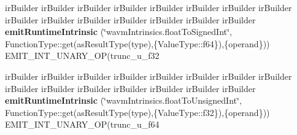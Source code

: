 \begin{DoxyCompactItemize}
ir\+Builder ir\+Builder ir\+Builder ir\+Builder ir\+Builder ir\+Builder ir\+Builder ir\+Builder ir\+Builder ir\+Builder ir\+Builder ir\+Builder ir\+Builder ir\+Builder ir\+Builder {\bfseries emit\+Runtime\+Intrinsic} (\char`\"{}wavm\+Intrinsics.\+float\+To\+Signed\+Int\char`\"{}, Function\+Type\+::get(as\+Result\+Type(type),\{Value\+Type\+::f64\}),\{operand\})) E\+M\+I\+T\+\_\+\+I\+N\+T\+\_\+\+U\+N\+A\+R\+Y\+\_\+\+OP(trunc\+\_\+u\+\_\+f32
\item 
\mbox{\label{struct_l_l_v_m_j_i_t_1_1_emit_function_context_a675ab2f90e2935532bf7257f28fbc1bd}} 
ir\+Builder ir\+Builder ir\+Builder ir\+Builder ir\+Builder ir\+Builder ir\+Builder ir\+Builder ir\+Builder ir\+Builder ir\+Builder ir\+Builder ir\+Builder ir\+Builder ir\+Builder {\bfseries emit\+Runtime\+Intrinsic} (\char`\"{}wavm\+Intrinsics.\+float\+To\+Unsigned\+Int\char`\"{}, Function\+Type\+::get(as\+Result\+Type(type),\{Value\+Type\+::f32\}),\{operand\})) E\+M\+I\+T\+\_\+\+I\+N\+T\+\_\+\+U\+N\+A\+R\+Y\+\_\+\+OP(trunc\+\_\+u\+\_\+f64
\end{DoxyCompactItemize}
